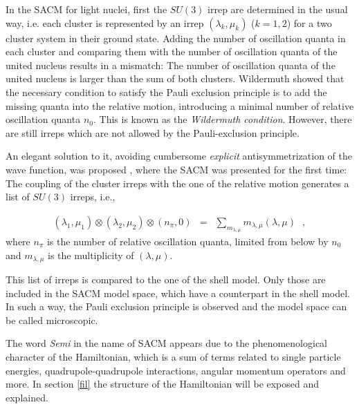 \documentclass[12pt]{article}
\newcommand{\beqa}{\begin{eqnarray}}
\newcommand{\eeqa}{\end{eqnarray}}
\begin{document}
In the SACM for light nuclei, first the $SU(3)$ irrep are determined in the usual way, i.e.
each cluster is represented by an irrep $\left( \lambda_k,\mu_k\right)$ ($k=1,2$)
for a two cluster system in their ground state. 
Adding the number of oscillation quanta in each cluster and
comparing them with the number of oscillation quanta of the united nucleus results in
a mismatch: The number of oscillation quanta of the united nucleus is larger than
the sum of both clusters. Wildermuth \cite{wildermuth} showed that the necessary condition
to satisfy the Pauli exclusion principle is to add 
the missing quanta into the relative motion, 
introducing a minimal number of relative 
oscillation quanta $n_0$.
This is known as the {\it Wildermuth condition}.  However, there are 
still irreps which are not allowed by the Pauli-exclusion principle. 

An elegant solution to it, avoiding cumbersome {\it explicit} antisymmetrization of the wave function, was proposed \cite{cseh-letter,cseh-levai-anph}, where the SACM was presented for the first time: 
The coupling of the cluster irreps with the one of the relative motion generates a list of $SU(3)$ irreps, i.e.,

\beqa
\left(\lambda_1,\mu_1\right) \otimes \left(\lambda_2,\mu_2\right) \otimes
\left(n_\pi , 0\right) & = & \sum_{m_{\lambda , \mu} } m_{\lambda , \mu} 
\left( \lambda , \mu \right)
~~~,
\label{eq-2}
\eeqa
where $n_\pi$ is the number of relative oscillation quanta, limited from below
by $n_0$ and $m_{\lambda , \mu}$ is the multiplicity of
$\left( \lambda , \mu \right)$.

This list of irreps is compared to the one of the shell model. Only those
are included in the SACM model space, which have a counterpart in the shell model.
In such a way, the Pauli exclusion principle is observed and the model space can be  called  microscopic.

The word {\it Semi}  in the name of SACM appears due to the phenomenological character
of the Hamiltonian, which is a sum of terms related to single particle energies, 
quadrupole-quadrupole interactions, angular momentum operators and more. In section \ref{fil}
the structure of the Hamiltonian
will be exposed and explained.
\end{document}
